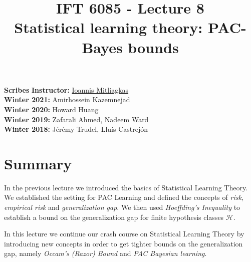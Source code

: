 \documentclass{article}
\title{IFT 6085 - Lecture 8 \\ 
Statistical learning theory: PAC-Bayes bounds}
\date{}
\begin{document}
 

\maketitle
\textbf{Scribes}\hfill
\textbf{Instructor:} {\href{https://mitliagkas.github.io/}{Ioannis Mitliagkas}}\\
\textbf{Winter 2021:} Amirhossein Kazemnejad\\
\textbf{Winter 2020:} Howard Huang\\
\textbf{Winter 2019:} Zafarali Ahmed, Nadeem Ward\\
\textbf{Winter 2018:} Jérémy Trudel, Lluís Castrejón
\hfill



\newcommand{\infgc}{\inf_{g \in \mathcal{C}}}
\newcommand{\supgc}{\sup_{g \in \mathcal{C}}}

\newcommand{\Prob}{\mathbb{P}}
\newcommand{\E}{\mathbb{E}}
\newcommand{\reals}{\mathbb{R}}


\section{Summary}
In the previous lecture we introduced the basics of Statistical Learning Theory. We established the setting for PAC Learning and defined the concepts of \textit{risk}, \textit{empirical risk} and \textit{generalization gap}. We then used \textit{Hoeffding's Inequality} to establish a bound on the generalization gap for finite hypothesis classes $\mathcal{H}$.

\vspace{2ex}

In this lecture we continue our crash course on Statistical Learning Theory by introducing new concepts in order to get tighter bounds on the generalization gap, namely \textit{Occam's (Razor) Bound} and \textit{PAC Bayesian learning}. 
\end{document}
